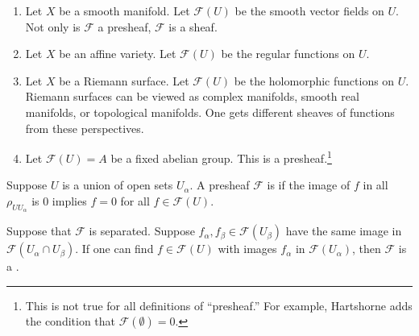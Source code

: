 \documentclass [11 pt, oneside, margin = 1 in] {article}
\begin{document}
\begin{example}[Presheaves]\label{}\text{}
\begin{enumerate}
	\item Let $X$ be a smooth manifold. Let $\mathscr{F}(U)$ be the smooth vector fields on $U$. Not only is $\mathscr{F}$ a presheaf, $\mathscr{F}$ is a sheaf.
	\item Let $X$ be an affine variety. Let $\mathscr{F}(U)$ be the regular functions on $U$.
	\item Let $X$ be a Riemann surface. Let $\mathscr{F}(U)$ be the holomorphic functions on $U$. Riemann surfaces can be viewed as complex manifolds, smooth real manifolds, or topological manifolds. One gets different sheaves of functions from these perspectives.
	\item Let $\mathscr{F}(U) = A$ be a fixed abelian group. This is a presheaf.\footnote{This is not true for all definitions of ``presheaf.'' For example, Hartshorne adds the condition that $\mathscr{F}(\emptyset) = 0$.}
\end{enumerate}
\end{example}


Suppose $U$ is a union of open sets $U_\alpha$. A presheaf $\mathscr{F}$ is  if the image of $f$ in all $\rho_{UU_\alpha}$ is $0$ implies $f=0$ for all $f\in \mathscr{F}(U)$. 

Suppose that $\mathscr{F}$ is separated. Suppose $f_\alpha,f_\beta\in \mathscr{F}(U_\beta)$ have the same image in $\mathscr{F}(U_\alpha\cap U_\beta)$. If one can find $f\in \mathscr{F}(U)$ with images $f_\alpha$ in $\mathscr{F}(U_\alpha)$, then $\mathscr{F}$ is a .
\end{document}
